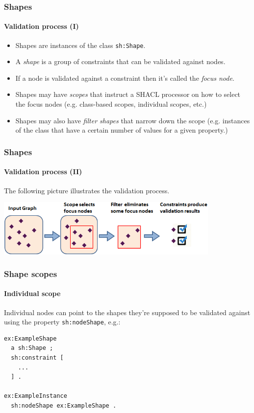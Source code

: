 \documentclass{beamer}
\begin{document}
\begin{frame}
  \frametitle{Shapes}
  \framesubtitle{Validation process (I)}

  \begin{itemize}
    \item Shapes are instances of the class \texttt{sh:Shape}.

    \pause

    \item A \textit{shape} is a group of constraints that can be validated
      against nodes.

    \pause

    \item If a node is validated against a constraint then it's called the \textit{focus node}.

    \pause

    \item Shapes may have \textit{scopes} that instruct a SHACL processor on
      how to select the focus nodes (e.g. class-based scopes, individual
      scopes, etc.)

    \pause

    \item Shapes may also have \textit{filter shapes} that narrow down the
      scope (e.g. instances of the class that have a certain number of values
      for a given property.)
  \end{itemize}
\end{frame}

\begin{frame}
  \frametitle{Shapes}
  \framesubtitle{Validation process (II)}

  The following picture illustrates the validation process.

  \vspace{1cm}

  \begin{center}
    \includegraphics[width=11cm]{shacl-validation-process.png}
  \end{center}
\end{frame}

\begin{frame}[fragile]
  \frametitle{Shape scopes}
  \framesubtitle{Individual scope}

  Individual nodes can point to the shapes they're supposed to be validated
  against using the property \texttt{sh:nodeShape}, e.g.:

  \vspace{1cm}

  \begin{Verbatim}
ex:ExampleShape
  a sh:Shape ;
  sh:constraint [
    ...
  ] .

ex:ExampleInstance
  sh:nodeShape ex:ExampleShape .
  \end{Verbatim}
\end{frame}
\end{document}
